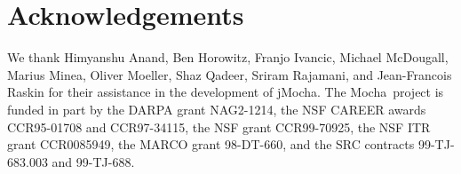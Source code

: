 \documentclass[10pt,twocolumn]{article}
\def\jmocha{{\small\sc jMocha}}
\def\mocha{{\small\sc Mocha}}
\begin{document}


\section*{Acknowledgements}
We thank Himyanshu Anand, Ben Horowitz, Franjo Ivancic, Michael McDougall,
Marius Minea, Oliver Moeller, Shaz Qadeer, Sriram Rajamani, and Jean-Francois
Raskin for their assistance in the development of \jmocha. 
The \mocha\ project is
funded in part by the DARPA 
grant NAG2-1214, the NSF CAREER awards
CCR95-01708 and CCR97-34115, the NSF grant CCR99-70925, the NSF ITR grant
CCR0085949,
the MARCO grant 98-DT-660, and the SRC contracts 99-TJ-683.003 and 99-TJ-688. 
\end{document}

